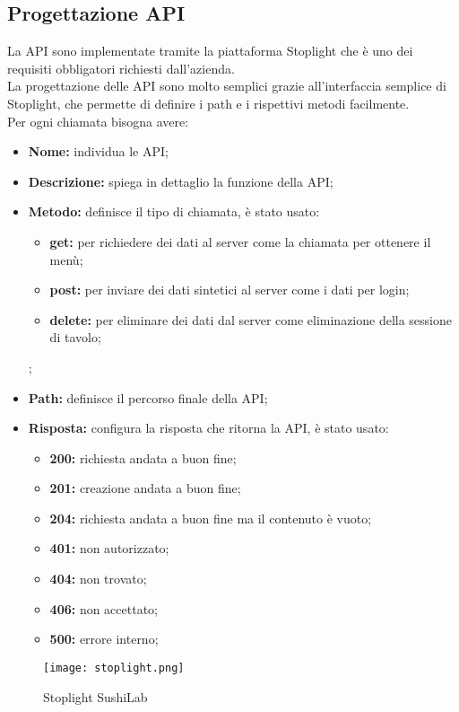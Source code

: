 \subsection{Progettazione API}
La API sono implementate tramite la piattaforma Stoplight che è uno dei requisiti obbligatori richiesti dall'azienda.\\
La progettazione delle API sono molto semplici grazie all'interfaccia semplice di Stoplight, che permette di definire i path\gl{} e i rispettivi metodi facilmente.\\
Per ogni chiamata bisogna avere:
\begin{itemize}
    \item \textbf{Nome:} individua le API;
    \item \textbf{Descrizione:} spiega in dettaglio la funzione della API;
    \item \textbf{Metodo:} definisce il tipo di chiamata, è stato usato:
    \begin{itemize}
        \item  \textbf{get:} per richiedere dei dati al server come la chiamata per ottenere il menù;
        \item  \textbf{post:} per inviare dei dati sintetici al server come i dati per login;
        \item  \textbf{delete:} per eliminare dei dati dal server come eliminazione della sessione di tavolo;        
    \end{itemize};
    \item \textbf{Path:} definisce il percorso finale della API;
    \item \textbf{Risposta:} configura la risposta che ritorna la API, è stato usato:
    \begin{itemize}
        \item  \textbf{200:} richiesta andata a buon fine;
        \item  \textbf{201:} creazione andata a buon fine;
        \item  \textbf{204:} richiesta andata a buon fine ma il contenuto è vuoto;
        \item  \textbf{401:} non autorizzato;
        \item  \textbf{404:} non trovato;
        \item  \textbf{406:} non accettato;
        \item  \textbf{500:} errore interno;
    \end{itemize}
\end{itemize}
\begin{figure}[H]
    \centering
    \texttt{[image: stoplight.png]}
    \caption{Stoplight SushiLab}
\end{figure}
